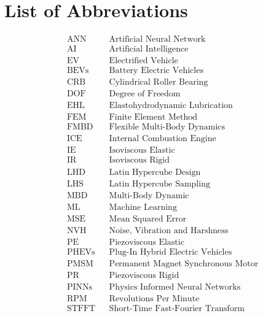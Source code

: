 
\chapter*{List of Abbreviations}
\begin{align*}
	&\text{ANN} &&\text{Artificial Neural Network}\\
	&\text{AI} &&\text{Artificial Intelligence}\\
	&\text{EV} &&\text{Electrified Vehicle}\\
	&\text{BEVs} &&\text{Battery Electric Vehicles}\\
	&\text{CRB} &&\text{Cylindrical Roller Bearing}\\
	&\text{DOF} &&\text{Degree of Freedom}\\
	&\text{EHL} &&\text{Elastohydrodynamic Lubrication}\\
	&\text{FEM} &&\text{Finite Element Method}\\
	&\text{FMBD} &&\text{Flexible Multi-Body Dynamics}\\
	&\text{ICE} &&\text{Internal Combustion Engine}\\
	&\text{IE} &&\text{Isoviscous Elastic}\\
	&\text{IR} &&\text{Isoviscous Rigid}\\
	&\text{LHD} &&\text{Latin Hypercube Design}\\
	&\text{LHS} &&\text{Latin Hypercube Sampling}\\
	&\text{MBD} &&\text{Multi-Body Dynamic}\\
	&\text{ML} &&\text{Machine Learning}\\
	&\text{MSE} &&\text{Mean Squared Error}\\
	&\text{NVH} &&\text{Noise, Vibration and Harshness}\\
	&\text{PE} &&\text{Piezoviscous Elastic}\\
	&\text{PHEVs} &&\text{Plug-In Hybrid Electric Vehicles}\\
	&\text{PMSM} &&\text{Permanent Magnet Synchronous Motor}\\
	&\text{PR} &&\text{Piezoviscous Rigid}\\
	&\text{PINNs} &&\text{Physics Informed Neural Networks}\\
	&\text{RPM} &&\text{Revolutions Per Minute}\\
	&\text{STFFT} &&\text{Short-Time Fast-Fourier Transform}\\
\end{align*}

